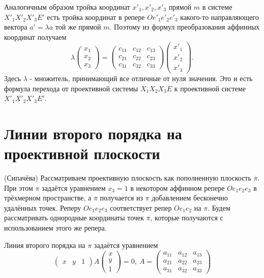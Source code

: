 \documentclass[a4paper, 12pt]{article}
\theoremstyle{definition}
\begin{document}
Аналогичным образом тройка координат $x'_1, x'_2, x'_3$ прямой $m$ в системе $X'_1X'_2X'_3E'$ есть тройка координат в репере $Oe'_1e'_2e'_3$ какого-то направляющего вектора $a' = \lambda a$ той же прямой $m$.
Поэтому из формул преобразования аффинных координат получаем
\[ \lambda \begin{pmatrix}
    x_1 \\ x_2 \\ x_3
\end{pmatrix} = 
\begin{pmatrix} c_{11}&c_{12}&c_{13} \\ c_{21}&c_{22}&c_{23} \\ c_{31}&c_{32}&c_{33} \end{pmatrix}
\begin{pmatrix}
    x'_1 \\ x'_2 \\ x'_3
\end{pmatrix}. \]
Здесь $\lambda$ - множитель, принимающий все отличные от нуля значения. Это и есть формула перехода от проективной системы $X_1X_2X_3E$ к проективной системе $X'_1X'_2X'_3E'$.


\section{Линии второго порядка на проективной плоскости}
(Сипачёва) Рассматриваем проективную плоскость как пополненную плоскость $\overline{\pi}$.
При этом $\pi$ задаётся уравнением $x_3 = 1$ в некотором аффинном репере $Oe_1e_2e_3$ в трёхмерном пространстве, а $\overline{\pi}$ получается из $\pi$ добавлением бесконечно удалённых точек.
Реперу $Oe_1e_2e_3$ соответствует репер $Oe_1e_2$ на $\pi$.
Будем рассматривать однородные координаты точек $\overline{\pi}$, которые получаются с использованием этого же репера.

Линия второго порядка на $\pi$ задаётся уравнением
\[ \begin{pmatrix} x&y&1 \end{pmatrix} A \begin{pmatrix} x \\ y \\ 1 \end{pmatrix} = 0, \
A = \begin{pmatrix}
    a_{11} & a_{12} & a_{13} \\ a_{21} & a_{22} & a_{23} \\ a_{31} & a_{32} & a_{33}
\end{pmatrix}
\]
\end{document}
